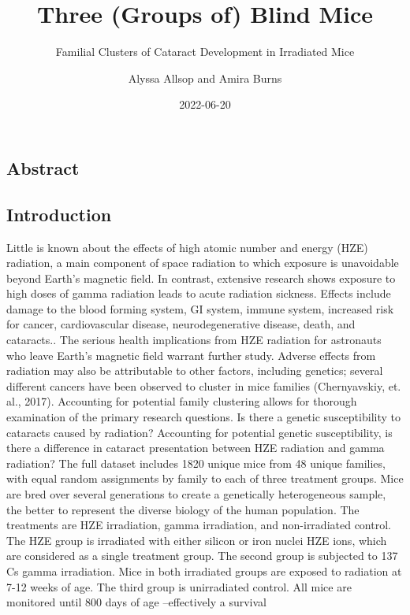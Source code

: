\documentclass[
]{article}
\title{Three (Groups of) Blind Mice}
\subtitle{Familial Clusters of Cataract Development in Irradiated Mice}
\author{Alyssa Allsop and Amira Burns}
\date{2022-06-20}
\begin{document}
\maketitle

\hypertarget{abstract}{%
\subsection{Abstract}\label{abstract}}

\hypertarget{introduction}{%
\subsection{Introduction}\label{introduction}}

Little is known about the effects of high atomic number and energy (HZE)
radiation, a main component of space radiation to which exposure is
unavoidable beyond Earth's magnetic field. In contrast, extensive
research shows exposure to high doses of gamma radiation leads to acute
radiation sickness. Effects include damage to the blood forming system,
GI system, immune system, increased risk for cancer, cardiovascular
disease, neurodegenerative disease, death, and cataracts.. The serious
health implications from HZE radiation for astronauts who leave Earth's
magnetic field warrant further study. Adverse effects from radiation may
also be attributable to other factors, including genetics; several
different cancers have been observed to cluster in mice families
(Chernyavskiy, et. al., 2017). Accounting for potential family
clustering allows for thorough examination of the primary research
questions. Is there a genetic susceptibility to cataracts caused by
radiation? Accounting for potential genetic susceptibility, is there a
difference in cataract presentation between HZE radiation and gamma
radiation? The full dataset includes 1820 unique mice from 48 unique
families, with equal random assignments by family to each of three
treatment groups. Mice are bred over several generations to create a
genetically heterogeneous sample, the better to represent the diverse
biology of the human population. The treatments are HZE irradiation,
gamma irradiation, and non-irradiated control. The HZE group is
irradiated with either silicon or iron nuclei HZE ions, which are
considered as a single treatment group. The second group is subjected to
137 Cs gamma irradiation. Mice in both irradiated groups are exposed to
radiation at 7-12 weeks of age. The third group is unirradiated control.
All mice are monitored until 800 days of age --effectively a survival
\end{document}
